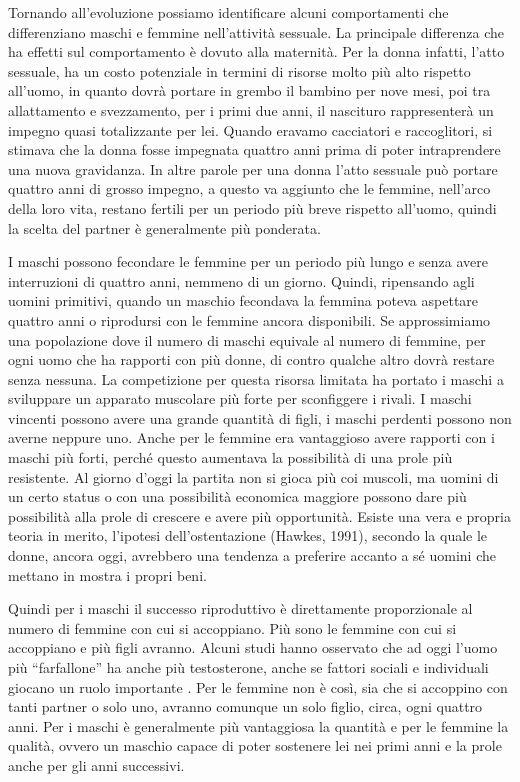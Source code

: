 \documentclass[12pt]{book} %
\begin{document}
Tornando all'evoluzione possiamo identificare alcuni comportamenti che differenziano maschi e
femmine nell'attività sessuale. La principale differenza che ha effetti sul comportamento è dovuto
alla maternità. Per la donna infatti, l'atto sessuale, ha un costo potenziale in termini di
risorse molto più alto rispetto all'uomo, in quanto dovrà portare in grembo il bambino per nove
mesi, poi tra allattamento e svezzamento, per i primi due anni, il nascituro rappresenterà un impegno quasi
totalizzante per lei. Quando eravamo cacciatori e raccoglitori, si stimava che la donna fosse impegnata quattro anni
prima di poter intraprendere una nuova gravidanza. In altre parole per una donna l'atto sessuale
può portare quattro anni di grosso impegno, a questo va aggiunto che le femmine, nell'arco della
loro vita, restano fertili per un periodo più breve rispetto all'uomo, quindi la scelta del
partner è generalmente più ponderata.

I maschi possono fecondare le femmine per
un periodo più lungo e senza avere interruzioni di quattro anni, nemmeno di un giorno. Quindi, ripensando agli uomini
primitivi, quando un maschio fecondava la femmina poteva aspettare quattro anni o riprodursi con le femmine ancora
disponibili. Se approssimiamo una popolazione dove il numero di maschi equivale al numero di femmine, per ogni uomo che
ha rapporti con più donne, di contro qualche altro dovrà restare senza nessuna. La competizione per questa risorsa
limitata ha portato i maschi a sviluppare un apparato muscolare più forte per sconfiggere i rivali. I maschi vincenti
possono avere una grande quantità di figli, i maschi perdenti possono non averne neppure uno. Anche per le femmine era
vantaggioso avere rapporti con i maschi più forti, perché questo aumentava la possibilità di una prole più resistente.
Al giorno d'oggi la partita non si gioca più coi muscoli, ma uomini di un certo status o con una
possibilità economica maggiore possono dare più possibilità alla prole di crescere e avere più opportunità. Esiste una
vera e propria teoria in merito, l'ipotesi dell'ostentazione (Hawkes, 1991),
secondo la quale le donne, ancora oggi, avrebbero una tendenza a preferire accanto a sé uomini che mettano in mostra i propri beni. 

Quindi per i maschi il successo riproduttivo è direttamente proporzionale al numero di femmine con cui si accoppiano.
Più sono le femmine con cui si accoppiano e più figli avranno. Alcuni studi hanno osservato che ad oggi l'uomo più
“farfallone” ha anche più testosterone, anche se fattori sociali e individuali giocano un ruolo importante  . Per le femmine non è così, sia che si accoppino con tanti partner o solo uno,
avranno comunque un solo figlio, circa, ogni quattro anni. Per i maschi è generalmente più vantaggiosa la quantità e per le femmine
la qualità, ovvero un maschio capace di poter sostenere lei nei primi anni e la prole anche per gli anni successivi.
\end{document}
